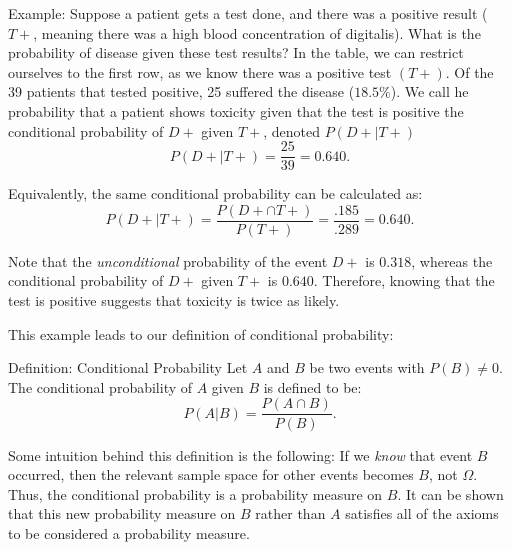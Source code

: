 \begin{frame}[allowframebreaks]{Example: }
  Suppose a patient gets a test done, and there was a positive result ($T+$, meaning there was a high blood concentration of digitalis).
  What is the probability of disease given these test results?
  In the table, we can restrict ourselves to the first row, as we know there was a positive test $(T+)$. 
  Of the 39 patients that tested positive, 25 suffered the disease ($18.5\%$).
  We call he probability that a patient shows toxicity given that the test is positive the \alert{conditional probability} of $D+$ given $T+$, denoted $P(D+ | T+)$
  $$
  P(D+ | T+) = \frac{25}{39} = 0.640.
  $$
  
  Equivalently, the same conditional probability can be calculated as:
  $$
  P(D+ | T+) = \frac{P(D+ \cap T+)}{P(T+)} = \frac{.185}{.289} = 0.640.
  $$
  
  Note that the \emph{unconditional} probability of the event $D+$ is $0.318$, whereas the conditional probability of $D+$ given $T+$ is $0.640$. Therefore, knowing that the test is positive suggests that toxicity is twice as likely.
  
  This example leads to our definition of conditional probability:
  
  \begin{block}{Definition: Conditional Probability}
    Let $A$ and $B$ be two events with $P(B) \neq 0$. The conditional probability of $A$ given $B$ is defined to be:
    $$
    P(A|B) = \frac{P(A \cap B)}{P(B)}.
    $$
  \end{block}
  Some intuition behind this definition is the following: If we \emph{know} that event $B$ occurred, then the relevant sample space for other events becomes $B$, not $\Omega$. Thus, the conditional probability is a probability measure on $B$. It can be shown that this new probability measure on $B$ rather than $A$ satisfies all of the axioms to be considered a probability measure.
  
\end{frame}

